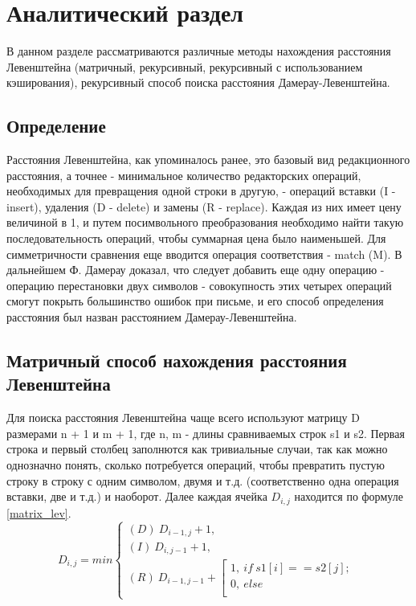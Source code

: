 \chapter{Аналитический раздел}
В данном разделе рассматриваются различные методы нахождения расстояния Левенштейна (матричный, рекурсивный, рекурсивный с использованием кэширования), рекурсивный способ поиска расстояния Дамерау-Левенштейна. 

\section{Определение}
Расстояния Левенштейна, как упоминалось ранее, это базовый вид редакционного расстояния, а точнее - минимальное количество редакторских операций, необходимых для превращения одной строки в другую, - операций вставки (I - insert), удаления (D - delete) и замены (R - replace). \cite{article_levenshtein} Каждая из них имеет цену величиной в 1, и путем посимвольного преобразования необходимо найти такую последовательность операций, чтобы суммарная цена было наименьшей. Для симметричности сравнения еще вводится операция соответствия - match (M). В дальнейшем Ф. Дамерау доказал, что следует добавить еще одну операцию - операцию перестановки двух символов - совокупность этих четырех операций смогут покрыть большинство ошибок при письме, и его способ определения расстояния был назван расстоянием Дамерау-Левенштейна.

\section{Матричный способ нахождения расстояния Левенштейна}
Для поиска расстояния Левенштейна чаще всего используют матрицу D размерами n + 1 и m + 1, где n, m - длины сравниваемых строк s1 и s2. Первая строка и первый столбец заполнются как тривиальные случаи, так как можно однозначно понять, сколько потребуется операций, чтобы превратить пустую строку в строку с одним символом, двумя и т.д. (соответственно одна операция вставки, две и т.д.) и наоборот. Далее каждая ячейка $D_{i,j}$ находится по формуле \ref{matrix_lev}.
\begin{equation}
	\label{matrix_lev}
	D_{i,j} = min
	\begin{cases}
		(D)~D_{i-1,j} + 1, \\
		(I)~D_{i,j-1} + 1, \\
		(R)~D_{i-1,j-1} + 
		\left[
		\begin{gathered}
			1,~if~s1[i] == s2[j]; \\
			0,~else \\
		\end{gathered}
		\right.
	\end{cases}
\end{equation}

